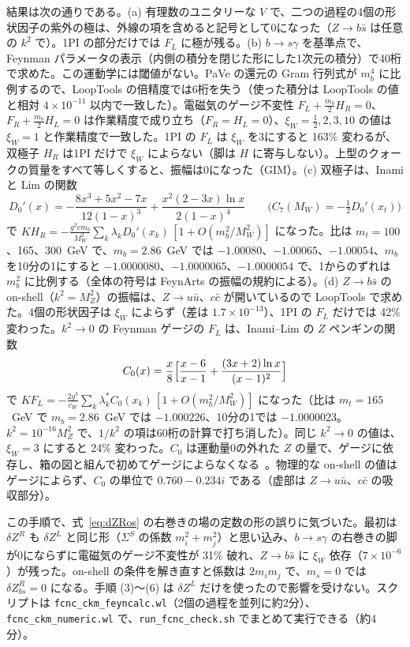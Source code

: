 \documentclass[a4paper,10pt]{ltjsarticle}
\newcommand{\cw}{c_W}
\begin{document}
結果は次の通りである。(a) 有理数のユニタリーな $V$ で、二つの過程の4個の形状因子の紫外の極は、外線の項を含めると記号として0になった（$Z\to b\bar s$ は任意の $k^2$ で）。1PI の部分だけでは $F_L$ に極が残る。(b) $b\to s\gamma$ を基準点で、Feynman パラメータの表示（内側の積分を閉じた形にした1次元の積分）で40桁で求めた。この運動学には閾値がない。PaVe の還元の Gram 行列式が $m_b^4$ に比例するので、LoopTools の倍精度では6桁を失う（使った積分は LoopTools の値と相対 $4\times10^{-11}$ 以内で一致した）。電磁気のゲージ不変性 $F_L+\frac{m_b}2H_R=0$、$F_R+\frac{m_b}2H_L=0$ は作業精度で成り立ち（$F_R=H_L=0$）、$\xi_W=\frac12,2,3,10$ の値は $\xi_W=1$ と作業精度で一致した。1PI の $F_L$ は $\xi_W$ を3にすると 163\% 変わるが、双極子 $H_R$ は1PI だけで $\xi_W$ によらない（脚は $H$ に寄与しない）。上型のクォークの質量をすべて等しくすると、振幅は0になった（GIM）。(c) 双極子は、Inami と Lim の関数~\cite{il81,bbl96}
\begin{equation}
D_0'(x)=-\frac{8x^3+5x^2-7x}{12(1-x)^3}+\frac{x^2(2-3x)\ln x}{2(1-x)^4}\qquad\bigl(C_7(M_W)=-\tfrac12D_0'(x_t)\bigr)
\label{eq:D0p}
\end{equation}
で $KH_R=-\frac{g^2em_b}{M_W^2}\sum_k\lambda_kD_0'(x_k)\,[1+O(m_b^2/M_W^2)]$ になった。比は $m_t=100$、165、300~GeV で、$m_b=2.86$~GeV では $-1.00080$、$-1.00065$、$-1.00054$、$m_b$ を10分の1にすると $-1.0000080$、$-1.0000065$、$-1.0000054$ で、1からのずれは $m_b^2$ に比例する（全体の符号は FeynArts の振幅の規約による）。(d) $Z\to b\bar s$ の on-shell（$k^2=M_Z^2$）の振幅は、$Z\to u\bar u$、$c\bar c$ が開いているので LoopTools で求めた。4個の形状因子は $\xi_W$ によらず（差は $1.7\times10^{-13}$）、1PI の $F_L$ だけでは 42\% 変わった。$k^2\to0$ の Feynman ゲージの $F_L$ は、Inami--Lim の $Z$ ペンギンの関数
\begin{equation}
C_0(x)=\frac x8\Bigl[\frac{x-6}{x-1}+\frac{(3x+2)\ln x}{(x-1)^2}\Bigr]
\label{eq:C0IL}
\end{equation}
で $KF_L=-\frac{2g^3}{\cw}\sum_k\lambda_k^*C_0(x_k)\,[1+O(m_b^2/M_W^2)]$ になった（比は $m_t=165$~GeV で $m_b=2.86$~GeV では $-1.000226$、10分の1では $-1.0000023$。$k^2=10^{-16}M_Z^2$ で、$1/k^2$ の項は60桁の計算で打ち消した）。同じ $k^2\to0$ の値は、$\xi_W=3$ にすると 24\% 変わった。$C_0$ は運動量0の外れた $Z$ の量で、ゲージに依存し、箱の図と組んで初めてゲージによらなくなる~\cite{bbl96}。物理的な on-shell の値はゲージによらず、$C_0$ の単位で $0.760-0.234i$ である（虚部は $Z\to u\bar u$、$c\bar c$ の吸収部分）。

この手順で、式~\eqref{eq:dZRos} の右巻きの場の定数の形の誤りに気づいた。最初は $\delta Z^R$ も $\delta Z^L$ と同じ形（$\Sigma^S$ の係数 $m_i^2+m_j^2$）と思い込み、$b\to s\gamma$ の右巻きの脚が0にならずに電磁気のゲージ不変性が 31\% 破れ、$Z\to b\bar s$ に $\xi_W$ 依存（$7\times10^{-6}$）が残った。on-shell の条件を解き直すと係数は $2m_im_j$ で、$m_s=0$ では $\delta Z^R_{bs}=0$ になる。手順 (3)〜(6) は $\delta Z^L$ だけを使ったので影響を受けない。スクリプトは \texttt{fcnc\_ckm\_feyncalc.wl}（2個の過程を並列に約2分）、\texttt{fcnc\_ckm\_numeric.wl} で、\texttt{run\_fcnc\_check.sh} でまとめて実行できる（約4分）。
\end{document}
